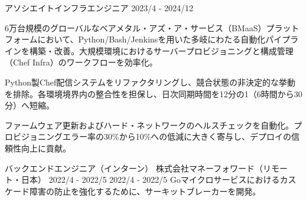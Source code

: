 \begin{cventries}
  \cventry
    {アソシエイトインフラエンジニア} %
    {} %
    {} %
    {2023/4 - 2024/12} %
    {
        \begin{cvitems}
        \item {6万台規模のグローバルなベアメタル・アズ・ア・サービス（BMaaS）プラットフォームにおいて、Python/Bash/Jenkinsを用いた多岐にわたる自動化パイプラインを構築・改善。大規模環境におけるサーバープロビジョニングと構成管理（Chef Infra）のワークフローを効率化。}
        \item {Python製Chef配信システムをリファクタリングし、競合状態の非決定的な挙動を排除。各環境境界内の整合性を担保し、日次同期時間を12分の1（6時間から30分）へ短縮。}
        \item {ファームウェア更新およびハード・ネットワークのヘルスチェックを自動化。プロビジョニングエラー率の30\%から10\%への低減に大きく寄与し、デプロイの信頼性向上に貢献。}
        \end{cvitems}
    }

  \cventry
    {バックエンドエンジニア（インターン）} %
    {株式会社マネーフォワード（リモート・日本）} %
    {2022/4 - 2022/5} %
    {2022/4 - 2022/5} %
    {
        Goマイクロサービスにおけるカスケード障害の防止を強化するために、サーキットブレーカーを開発。
    }



\end{cventries}
